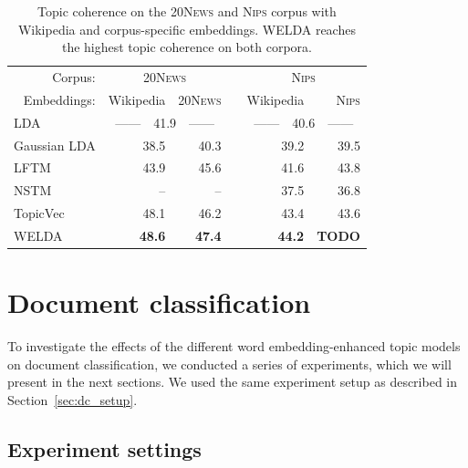 \documentclass[
        a4paper,
        titlepage,
        twoside,
        parskip,
        numbers=noenddot
        ]{scrbook}
\newcommand{\ra}[1]{\renewcommand{\arraystretch}{#1}}
\theoremstyle{break}
\begin{document}
\begin{table}[]
  \ra{1.3}
  \centering
  \caption{Topic coherence on the \textsc{20News} and \textsc{Nips} corpus with Wikipedia and corpus-specific embeddings. WELDA reaches the highest topic coherence on both corpora.}
  \label{table:topic_coherence}
  \begin{tabular}{@{}lrrcrr@{}}
    \toprule
                 \multicolumn{1}{r}{Corpus:} & \multicolumn{2}{c}{\textsc{20News}} && \multicolumn{2}{c}{\textsc{Nips}} \\ \cmidrule{2-3} \cmidrule{5-6}
                 \multicolumn{1}{r}{Embeddings:}  & Wikipedia     & \textsc{20News}     && Wikipedia     & \textsc{Nips}     \\
                 \midrule
                              LDA          & \multicolumn{2}{c}{------~~41.9~~------}      && \multicolumn{2}{c}{------~~40.6~~------} \\
                              Gaussian LDA & 38.5          & 40.3          && 39.2          & 39.5     \\
                              LFTM         & 43.9          & 45.6          && 41.6          & 43.8     \\
                              NSTM         & --            & --            && 37.5          & 36.8     \\
                              TopicVec     & 48.1          & 46.2          && 43.4          & 43.6     \\
                              WELDA        & \textbf{48.6} & \textbf{47.4} && \textbf{44.2} & \textbf{TODO}     \\
                              \bottomrule
  \end{tabular}
\end{table}

\section{Document classification}

To investigate the effects of the different word embedding-enhanced topic models on document classification, we conducted a series of experiments, which we will present in the next sections.
We used the same experiment setup as described in Section~\ref{sec:dc_setup}.

\subsection{Experiment settings}
\end{document}
